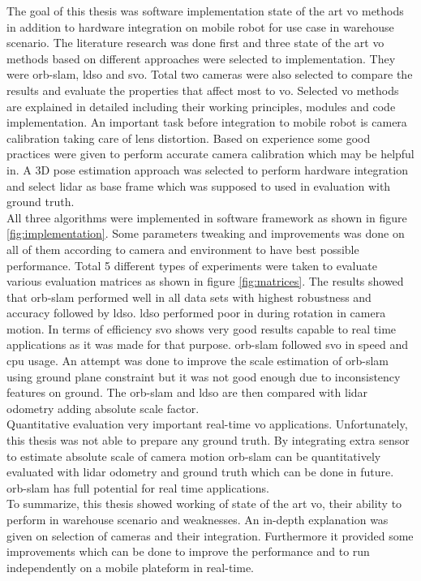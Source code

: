 The goal of this thesis was software implementation state of the art \acrshort{vo} methods in addition to hardware integration on mobile robot for use case in warehouse scenario. The literature research was done first and three state of the art \acrshort{vo} methods based on different approaches were selected to implementation. They were \acrshort{orb}-\acrshort{slam}, \acrshort{ldso} and \acrshort{svo}. Total two cameras were also selected to compare the results and evaluate the properties that affect most to \acrshort{vo}. Selected \acrshort{vo} methods are explained in detailed including their working principles, modules and code implementation. An important task before integration to mobile robot is camera calibration taking care of lens distortion. Based on experience some good practices were given to perform accurate camera calibration which may be helpful in. A 3D pose estimation approach was selected to perform hardware integration and select \acrshort{lidar} as base frame which was supposed to used in evaluation with ground truth.\\
\newline
All three algorithms were implemented in software framework as shown in figure \ref{fig:implementation}.
Some parameters tweaking and improvements was done on all of them according to camera and environment to have best possible performance. Total 5 different types of experiments were taken to evaluate various evaluation matrices as shown in figure \ref{fig:matrices}. The results showed that \acrshort{orb}-\acrshort{slam} performed well in all data sets with highest robustness and accuracy followed by \acrshort{ldso}. \acrshort{ldso} performed poor in during rotation in camera motion. In terms of efficiency \acrshort{svo} shows very good results capable to real time applications as it was made for that purpose. \acrshort{orb}-\acrshort{slam} followed \acrshort{svo} in speed and \acrshort{cpu} usage.
An attempt was done to improve the scale estimation of \acrshort{orb}-\acrshort{slam} using ground plane constraint but it was not good enough due to inconsistency features on ground. The \acrshort{orb}-\acrshort{slam} and \acrshort{ldso} are then compared with \acrshort{lidar} odometry adding absolute scale factor. \\
\newline
Quantitative evaluation very important real-time \acrshort{vo} applications. Unfortunately, this thesis was not able to prepare any ground truth. By integrating extra sensor to estimate absolute scale of camera motion \acrshort{orb}-\acrshort{slam} can be quantitatively evaluated with \acrshort{lidar} odometry and ground truth which can be done in future. \acrshort{orb}-\acrshort{slam} has full potential for real time applications.\\
\newline
To summarize, this thesis showed working of state of the art \acrshort{vo}, their ability to perform in warehouse scenario and weaknesses. An in-depth explanation was given on selection of cameras and their integration. Furthermore it provided some improvements which can be done to improve the performance and to run independently on a mobile plateform in real-time.